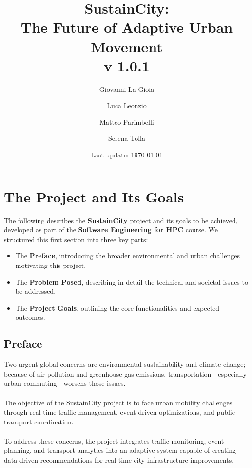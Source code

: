 \documentclass[a4paper,12pt]{article}
\title{SustainCity: \\ The Future of Adaptive Urban Movement \\ v 1.0.1} %
\author[1]{Giovanni La Gioia}
\author[2]{Luca Leonzio}
\author[3]{Matteo Parimbelli}
\author[4]{Serena Tolla}
\affil[1,2,3,4]{Politecnico di Milano}
\date{Last update: \today}
\begin{document}
\maketitle
\newpage
\tableofcontents
\clearpage
\newpage

\section{The Project and Its Goals}
The following describes the \textbf{SustainCity} project and its goals to be achieved, developed as part of the \textbf{Software Engineering for HPC} course. We structured this first section into three key parts:
\begin{itemize}
    \item The \textbf{Preface}, introducing the broader environmental and urban challenges motivating this project.
    \item The \textbf{Problem Posed}, describing in detail the technical and societal issues to be addressed.
    \item The \textbf{Project Goals}, outlining the core functionalities and expected outcomes.
\end{itemize}

\subsection*{Preface}
Two urgent global concerns are environmental sustainability and climate change; because of air pollution and greenhouse gas emissions, transportation - especially urban commuting - worsens those issues. 
\\ \\ The objective of the SustainCity project is to face urban mobility challenges through real-time traffic management, event-driven optimizations, and public transport coordination. 
\\ \\To address these concerns, the project integrates traffic monitoring, event planning, and transport analytics into an adaptive system capable of creating data-driven recommendations for real-time city infrastructure improvements.
\end{document}
